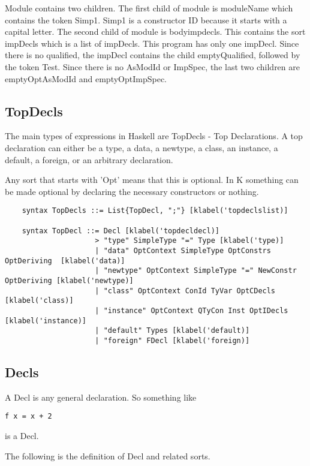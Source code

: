 Module contains two children. The first child of module is moduleName which contains the token Simp1. Simp1 is a constructor ID because it starts with a capital letter. The second child of module is bodyimpdecls. This contains the sort impDecls which is a list of impDecls. This program has only one impDecl. Since there is no qualified, the impDecl contains the child emptyQualified, followed by the token Test. Since there is no AsModId or ImpSpec, the last two children are emptyOptAsModId and emptyOptImpSpec.

\subsection{TopDecls}
The main types of expressions in Haskell are TopDecls - Top Declarations. A top declaration can either be a type, a data, a newtype, a class, an instance, a default, a foreign, or an arbitrary declaration.

Any sort that starts with 'Opt' means that this is optional. In K something can be made optional by declaring the necessary constructors or nothing.

\begin{lstlisting}
    syntax TopDecls ::= List{TopDecl, ";"} [klabel('topdeclslist)]

    syntax TopDecl ::= Decl [klabel('topdecldecl)]
                     > "type" SimpleType "=" Type [klabel('type)]
                     | "data" OptContext SimpleType OptConstrs OptDeriving  [klabel('data)]
                     | "newtype" OptContext SimpleType "=" NewConstr OptDeriving [klabel('newtype)]
                     | "class" OptContext ConId TyVar OptCDecls [klabel('class)]
                     | "instance" OptContext QTyCon Inst OptIDecls [klabel('instance)]
                     | "default" Types [klabel('default)]
                     | "foreign" FDecl [klabel('foreign)]
\end{lstlisting}

\subsection{Decls}

A Decl is any general declaration. So something like

\begin{lstlisting}
f x = x + 2
\end{lstlisting}

is a Decl.

The following is the definition of Decl and related sorts.

